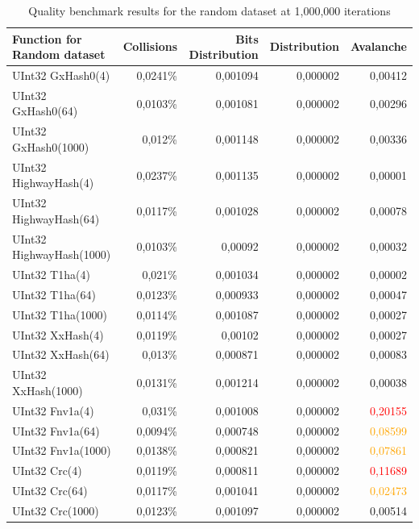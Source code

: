 \documentclass[10pt]{article}
\begin{document}
\begin{table}[H]
\centering
\begin{tabular}{|l|r|r|r|r|}
\hline
\textbf{Function for Random dataset} & \textbf{Collisions} & \textbf{Bits Distribution} & \textbf{Distribution} & \textbf{Avalanche} \\
\hline
UInt32 GxHash0(4)            & 0,0241\% & 0,001094  & 0,000002 & 0,00412 \\
UInt32 GxHash0(64)           & 0,0103\% & 0,001081  & 0,000002 & 0,00296 \\
UInt32 GxHash0(1000)         & 0,012\%  & 0,001148  & 0,000002 & 0,00336 \\
UInt32 HighwayHash(4)        & 0,0237\% & 0,001135  & 0,000002 & 0,00001 \\
UInt32 HighwayHash(64)       & 0,0117\% & 0,001028  & 0,000002 & 0,00078 \\
UInt32 HighwayHash(1000)     & 0,0103\% & 0,00092   & 0,000002 & 0,00032 \\
UInt32 T1ha(4)               & 0,021\%  & 0,001034  & 0,000002 & 0,00002 \\
UInt32 T1ha(64)              & 0,0123\% & 0,000933  & 0,000002 & 0,00047 \\
UInt32 T1ha(1000)            & 0,0114\% & 0,001087  & 0,000002 & 0,00027 \\
UInt32 XxHash(4)            & 0,0119\% & 0,00102   & 0,000002 & 0,00027 \\
UInt32 XxHash(64)           & 0,013\%  & 0,000871  & 0,000002 & 0,00083 \\
UInt32 XxHash(1000)         & 0,0131\% & 0,001214  & 0,000002 & 0,00038 \\
UInt32 Fnv1a(4)             & 0,031\%  & 0,001008  & 0,000002 & \textcolor{red}{0,20155} \\
UInt32 Fnv1a(64)            & 0,0094\% & 0,000748  & 0,000002 & \textcolor{orange}{0,08599} \\
UInt32 Fnv1a(1000)          & 0,0138\% & 0,000821  & 0,000002 & \textcolor{orange}{0,07861} \\
UInt32 Crc(4)               & 0,0119\% & 0,000811  & 0,000002 & \textcolor{red}{0,11689} \\
UInt32 Crc(64)              & 0,0117\% & 0,001041  & 0,000002 & \textcolor{orange}{0,02473} \\
UInt32 Crc(1000)            & 0,0123\% & 0,001097  & 0,000002 & 0,00514 \\
\hline
\end{tabular}
\caption{Quality benchmark results for the random dataset at 1,000,000 iterations}
\label{tab:quality-data-random}
\end{table}
    
\end{document}
